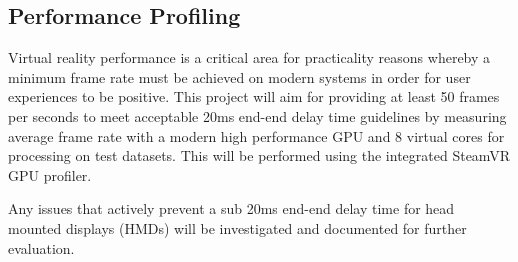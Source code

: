 \subsection{Performance Profiling}
Virtual reality performance is a critical area for practicality reasons whereby a minimum frame rate must be achieved on modern systems in order for user experiences to be positive. This project will aim for providing at least 50 frames per seconds to meet acceptable 20ms end-end delay time guidelines \cite{Raaen2018} by measuring average frame rate with a modern high performance GPU and 8 virtual cores for processing on test datasets. This will be performed using the integrated SteamVR GPU profiler.

Any issues that actively prevent a sub 20ms end-end delay time for head mounted displays (HMDs) will be investigated and documented for further evaluation.


